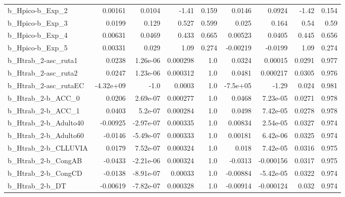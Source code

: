 \begin{tabular}{lrrrrrrrr}
b\_Hpico-b\_Exp\_2            &     0.00161 &       0.0104 &     -1.41 &    0.159 &     0.0146 &      0.0924 &        -1.42 &         0.154 \\
b\_Hpico-b\_Exp\_3            &      0.0199 &        0.129 &     0.527 &    0.599 &      0.025 &       0.164 &         0.54 &          0.59 \\
b\_Hpico-b\_Exp\_4            &     0.00631 &       0.0469 &     0.433 &    0.665 &    0.00523 &      0.0405 &        0.445 &         0.656 \\
b\_Hpico-b\_Exp\_5            &     0.00331 &        0.029 &      1.09 &    0.274 &   -0.00219 &     -0.0199 &         1.09 &         0.274 \\
b\_Htrab\_2-asc\_ruta1        &      0.0238 &     1.26e-06 &  0.000298 &      1.0 &     0.0324 &     0.00015 &       0.0291 &         0.977 \\
b\_Htrab\_2-asc\_ruta2        &      0.0247 &     1.23e-06 &  0.000312 &      1.0 &     0.0481 &    0.000217 &       0.0305 &         0.976 \\
b\_Htrab\_2-asc\_rutaEC       &   -4.32e+09 &         -1.0 &    0.0003 &      1.0 &   -7.5e+05 &       -1.29 &        0.024 &         0.981 \\
b\_Htrab\_2-b\_ACC\_0          &      0.0206 &     2.69e-07 &  0.000277 &      1.0 &     0.0468 &    7.23e-05 &       0.0271 &         0.978 \\
b\_Htrab\_2-b\_ACC\_1          &      0.0403 &      5.2e-07 &  0.000284 &      1.0 &     0.0498 &    7.42e-05 &       0.0278 &         0.978 \\
b\_Htrab\_2-b\_Adulto40       &    -0.00925 &    -2.97e-07 &  0.000335 &      1.0 &    0.00834 &    2.54e-05 &       0.0327 &         0.974 \\
b\_Htrab\_2-b\_Adulto60       &     -0.0146 &    -5.49e-07 &  0.000333 &      1.0 &    0.00181 &    6.42e-06 &       0.0325 &         0.974 \\
b\_Htrab\_2-b\_CLLUVIA        &      0.0179 &     7.52e-07 &  0.000324 &      1.0 &      0.018 &    7.42e-05 &       0.0316 &         0.975 \\
b\_Htrab\_2-b\_CongAB         &     -0.0433 &    -2.21e-06 &  0.000324 &      1.0 &    -0.0313 &   -0.000156 &       0.0317 &         0.975 \\
b\_Htrab\_2-b\_CongCD         &     -0.0138 &    -8.91e-07 &   0.00033 &      1.0 &   -0.00884 &   -5.42e-05 &       0.0322 &         0.974 \\
b\_Htrab\_2-b\_DT             &    -0.00619 &    -7.82e-07 &  0.000328 &      1.0 &   -0.00914 &   -0.000124 &        0.032 &         0.974 \\

\end{tabular}
